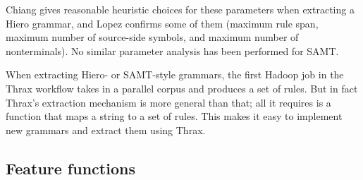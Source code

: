 \documentclass[11pt]{article}
\begin{document}
Chiang  gives reasonable heuristic choices for these parameters when extracting a Hiero grammar, and Lopez  confirms some of them (maximum rule span, maximum number of source-side symbols, and maximum number of nonterminals). No similar parameter analysis has been performed for SAMT.

When extracting Hiero- or SAMT-style grammars, the first Hadoop job in the Thrax workflow takes in a parallel corpus and produces a set of rules. But in fact Thrax's extraction mechanism is more general than that; all it requires is a function that maps a string to a set of rules. This makes it easy to implement new grammars and extract them using Thrax.

\subsection{Feature functions}
\label{features}
\end{document}
